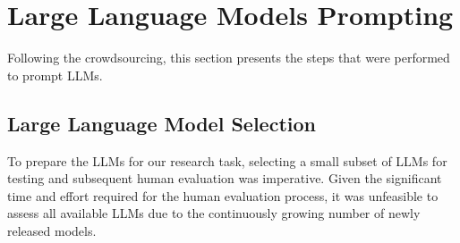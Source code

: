 \section{Large Language Models Prompting}
Following the crowdsourcing, this section presents the steps that were performed to prompt LLMs.
\subsection{Large Language Model Selection}
To prepare the LLMs for our research task, selecting a small subset of LLMs for testing and subsequent human evaluation was imperative. Given the significant time and effort required for the human evaluation process, it was unfeasible to assess all available LLMs due to the continuously growing number of newly released models.


